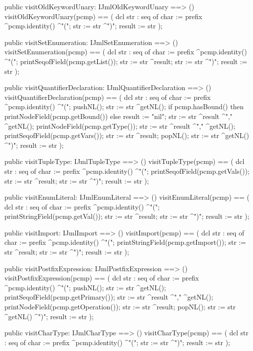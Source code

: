 \begin{vdm_al}
  public visitOldKeywordUnary: IJmlOldKeywordUnary ==> ()
  visitOldKeywordUnary(pcmp) ==
    ( dcl str : seq of char := prefix ^pcmp.identity() ^"(";
      str := str ^")";
      result := str );

  public visitSetEnumeration: IJmlSetEnumeration ==> ()
  visitSetEnumeration(pcmp) ==
    ( dcl str : seq of char := prefix ^pcmp.identity() ^"(";
      printSeqofField(pcmp.getList());
      str := str ^result;
      str := str ^")";
      result := str );

  public visitQuantifierDeclaration: IJmlQuantifierDeclaration ==> ()
  visitQuantifierDeclaration(pcmp) ==
    ( dcl str : seq of char := prefix ^pcmp.identity() ^"(";
      pushNL();
      str := str ^getNL();
      if pcmp.hasBound()
      then printNodeField(pcmp.getBound())
      else result := "nil";
      str := str ^result ^"," ^getNL();
      printNodeField(pcmp.getType());
      str := str ^result ^"," ^getNL();
      printSeqofField(pcmp.getVars());
      str := str ^result;
      popNL();
      str := str ^getNL() ^")";
      result := str );

  public visitTupleType: IJmlTupleType ==> ()
  visitTupleType(pcmp) ==
    ( dcl str : seq of char := prefix ^pcmp.identity() ^"(";
      printSeqofField(pcmp.getVals());
      str := str ^result;
      str := str ^")";
      result := str );

  public visitEnumLiteral: IJmlEnumLiteral ==> ()
  visitEnumLiteral(pcmp) ==
    ( dcl str : seq of char := prefix ^pcmp.identity() ^"(";
      printStringField(pcmp.getVal());
      str := str ^result;
      str := str ^")";
      result := str );

  public visitImport: IJmlImport ==> ()
  visitImport(pcmp) ==
    ( dcl str : seq of char := prefix ^pcmp.identity() ^"(";
      printStringField(pcmp.getImport());
      str := str ^result;
      str := str ^")";
      result := str );

  public visitPostfixExpression: IJmlPostfixExpression ==> ()
  visitPostfixExpression(pcmp) ==
    ( dcl str : seq of char := prefix ^pcmp.identity() ^"(";
      pushNL();
      str := str ^getNL();
      printSeqofField(pcmp.getPrimary());
      str := str ^result ^"," ^getNL();
      printNodeField(pcmp.getOperation());
      str := str ^result;
      popNL();
      str := str ^getNL() ^")";
      result := str );

  public visitCharType: IJmlCharType ==> ()
  visitCharType(pcmp) ==
    ( dcl str : seq of char := prefix ^pcmp.identity() ^"(";
      str := str ^")";
      result := str );


\end{vdm_al}
